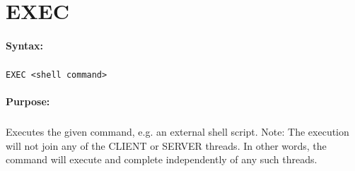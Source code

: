 
\newpage
\section{EXEC}
\label{cmd:EXEC}

\paragraph{Syntax:}
\subparagraph{}
\texttt{EXEC <shell command>}

\paragraph{Purpose:}
\subparagraph{}
Executes the given command, e.g. an external shell script. Note: The 
execution will not join any of the CLIENT or SERVER threads. In other 
words, the command will execute and complete independently of any such 
threads.